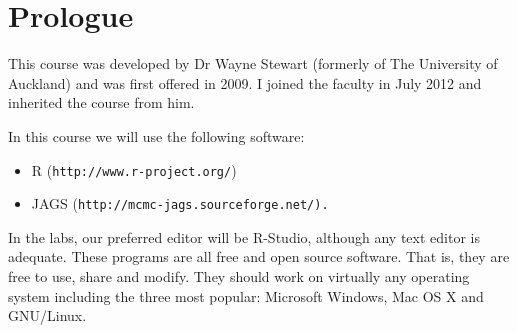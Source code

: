 \section{Prologue}

This course was developed by Dr Wayne Stewart (formerly of The University of
Auckland) and was first offered in 2009. I joined the faculty in July 2012
and inherited the course from him.

In this course we will use the following software:
\begin{itemize}
\item R ({\tt http://www.r-project.org/})
\item JAGS (\tt http://mcmc-jags.sourceforge.net/).
\end{itemize}

In the labs, our preferred editor will be R-Studio, although any text editor
is adequate.
These programs are all free and open source software. That is, they are free
to use, share and modify. They should work on
virtually any operating system including the three most popular:
Microsoft Windows, Mac OS X and GNU/Linux.

